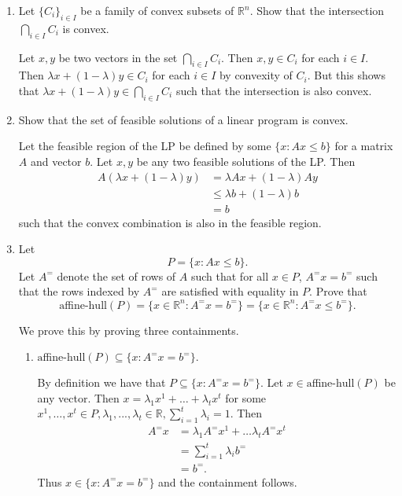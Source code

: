 \documentclass[11pt]{article}
\newcommand{\setR}{\mathbb{R}}
\renewcommand{\leq}{\leqslant}
\begin{document}
\begin{enumerate}[1)]
\begin{solution}
\end{solution}

\item Let $\{C_i\}_{i\in I}$ be a family of convex subsets of $\setR^n$.
  Show that the intersection $\bigcap_{i\in I} C_i$ is convex.
  
  
  \begin{solution}
  Let $x, y$ be two vectors in the set $\bigcap_{i \in I} C_i$. Then $x, y \in C_i$ for each $i \in I$. Then $\lambda x + (1-\lambda)y \in C_i$ for each $i \in I$ by convexity of $C_i$. But this shows that $\lambda x + (1-\lambda)y \in \bigcap_{i \in I}C_i$ such that the intersection is also convex.
  
  \end{solution}
  
  
\item Show that the set of feasible solutions  of a linear program  is
  convex. \label{conv:item:1}
  
  \begin{solution}
  Let the feasible region of the LP be defined by some $\{x : Ax\leq b\}$ for a matrix $A$ and vector $b$. Let $x, y$ be any two feasible solutions of the LP. Then 
  \begin{align*}
  A(\lambda x + (1 - \lambda)y) & = \lambda Ax + (1- \lambda)Ay \\
  & \leq \lambda b + (1 - \lambda)b \\
  & = b
  \end{align*}
  such that the convex combination is also in the feasible region. 
  
  
  \end{solution}
  
  \item Let $$P= \{x: Ax≤b\}.$$ 
  Let $A^=$ denote the set of rows of $A$ such that for all $x \in P$, $A^= x = b^=$ such that the rows indexed by $A^=$ are satisfied with equality in $P$. 
  Prove that 
$$\text{aﬃne-hull}(P) = \{x∈\setR^n : A^=
x= b^=\}= \{x∈\setR^n : A^=
x≤b^=\}.$$


\begin{solution}
We prove this by proving three containments.
\begin{enumerate}
\item $\text{aﬃne-hull}(P) ⊆
\{x: A^=
x= b^=\}.$ 


By definition we have that $P ⊆\{x: A^=
x= b^=\}$. Let $x∈\text{aﬃne-hull}(P)$ be any vector. Then $x= λ_1x^1 +\hdots+ λ_tx^t$ for some $x^1,\hdots,x^t ∈P, λ_1,...,λ_t ∈\setR, \sum_{i=1}^t λ_i = 1$. 
Then 
\begin{align*}
A^=x & = \lambda_1 A^= x^1 + \hdots \lambda_t A^= x^t \\
& = \displaystyle\sum_{i =1}^t\lambda_i b^= \\
& = b^=.
\end{align*}
Thus $x \in \{x : A^= x = b^=\}$ and the containment follows.


\end{enumerate}
\end{solution}
\end{enumerate}
\end{document}
